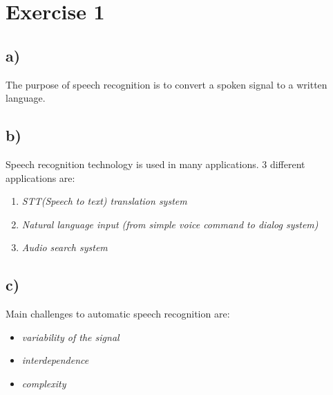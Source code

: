 \section*{Exercise 1} %
\label{sec:section_name}

\subsection*{a)} %
\label{sub:a}

The purpose of speech recognition is to convert a spoken signal to a written language.   


\subsection*{b)} %
\label{sub:b}

Speech recognition technology is used in many applications. 
3 different applications are:

\begin{enumerate}
	\item \emph{STT(Speech to text) translation system}
	\item \emph{Natural language input (from simple voice command to dialog system)}
	\item \emph{Audio search system}
\end{enumerate}



\subsection*{c)} %
\label{sub:c}

Main challenges to automatic speech recognition are:

\begin{itemize}
	\item \emph{variability of the signal}
	\item \emph{interdependence}
	\item \emph{complexity}
\end{itemize}

